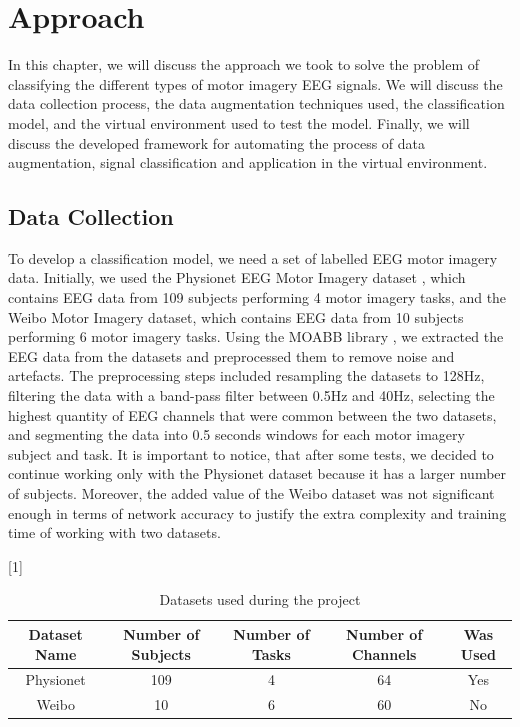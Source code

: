 \chapter{Approach}\label{ch:approach}
In this chapter, we will discuss the approach we took to solve the problem of classifying the different types of motor imagery EEG signals.
We will discuss the data collection process, the data augmentation techniques used, the classification model, and the virtual environment used to test the model. 
Finally, we will discuss the developed framework for automating the process of data augmentation, signal classification and application in the virtual environment.

\section{Data Collection}
To develop a classification model, we need a set of labelled EEG motor imagery data.
Initially, we used the Physionet EEG Motor Imagery dataset \cite{goldberger2000physiobank}, which contains EEG data from 109 subjects performing 4 motor imagery tasks, and the Weibo Motor Imagery \cite{yi2014evaluation} dataset, which contains EEG data from 10 subjects performing 6 motor imagery tasks.
Using the MOABB library \cite{Aristimunha_Mother_of_all_2023, chevallier2024largest, jayaram2018moabb}, we extracted the EEG data from the datasets and preprocessed them to remove noise and artefacts.
The preprocessing steps included resampling the datasets to 128Hz, filtering the data with a band-pass filter between 0.5Hz and 40Hz, selecting the highest quantity of EEG channels that were common between the two datasets, and segmenting the data into 0.5 seconds windows for each motor imagery subject and task.
It is important to notice, that after some tests, we decided to continue working only with the Physionet dataset because it has a larger number of subjects.
Moreover, the added value of the Weibo dataset was not significant enough in terms of network accuracy to justify the extra complexity and training time of working with two datasets.
\begin{table}[!htbp]
    \centering
    \scalebox{.8}[1]{
    \begin{tabular}{|c|c|c|c||c|}
        \hline
        \textbf{Dataset Name} & \textbf{Number of Subjects} & \textbf{Number of Tasks} & \textbf{Number of Channels} & \textbf{Was Used}\\
        \hline
        \hline
        Physionet & 109 & 4 & 64 & Yes\\
        \hline
        Weibo & 10 & 6 & 60 & No\\
        \hline
    \end{tabular}
    }
    \caption{Datasets used during the project}
    \label{tab:datasamples}
\end{table}

